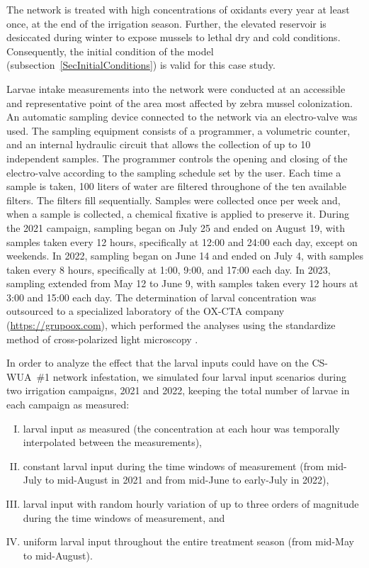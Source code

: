 \documentclass[review,authoryear]{elsarticle}
\begin{document}
The network is treated with high concentrations of oxidants every year at least
once, at the end of the irrigation season. Further, the elevated reservoir is
desiccated during winter to expose mussels to lethal dry and cold conditions.
Consequently, the initial condition of the model
(subsection~\ref{SecInitialConditions}) is valid for this case study.

Larvae intake measurements into the network were conducted at an accessible and
representative point of the area most affected by zebra mussel colonization. An
automatic sampling device connected to the network via an electro-valve was
used. The sampling equipment consists of a programmer, a volumetric counter, and
an internal hydraulic circuit that allows the collection of up to 10 independent
samples. The programmer controls the opening and closing of the electro-valve
according to the sampling schedule set by the user. Each time a sample is taken,
100 liters of water are filtered throughone of the ten available filters. The
filters fill sequentially. Samples were collected once per week and, when a
sample is collected, a chemical fixative is applied to preserve it. During the
2021 campaign, sampling began on July 25 and ended on August 19, with samples
taken every 12 hours, specifically at 12:00 and 24:00 each day, except on
weekends. In 2022, sampling began on June 14 and ended on July 4, with samples
taken every 8 hours, specifically at 1:00, 9:00, and 17:00 each day. In 2023,
sampling extended from May 12 to June 9, with samples taken every 12 hours at
3:00 and 15:00 each day. The determination of larval concentration was
outsourced to a specialized laboratory of the OX-CTA company
(\url{https://grupoox.com}), which performed the analyses using the
standardize method of cross-polarized light microscopy \citep{Frischer12}.

In order to analyze the effect that the larval inputs could have on the
CS-WUA~\#1 network infestation, we simulated four larval input scenarios during
two irrigation campaigns, 2021 and 2022, keeping the total number of larvae in
each campaign as measured:
\begin{enumerate}[I.]
\item larval input as measured (the concentration at each hour was temporally
	interpolated between the measurements), 
\item constant larval input during the time windows of measurement (from
	mid-July to mid-August in 2021 and from mid-June to early-July in 2022),
\item larval input with random hourly variation of up to three orders of
	magnitude during the time windows of measurement, and
\item uniform larval input throughout the entire treatment season (from mid-May
	to mid-August).
\end{enumerate}
\end{document}
